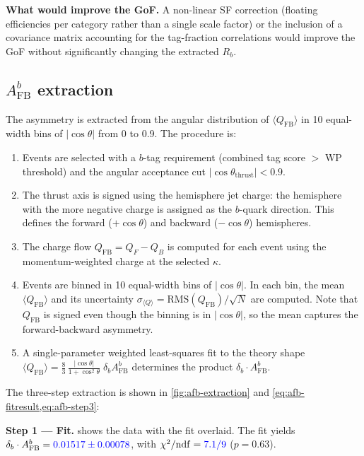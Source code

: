 \documentclass[11pt,a4paper]{article}
\newcommand{\measured}[1]{\textcolor{blue}{#1}}
\begin{document}
\textbf{What would improve the GoF.}
A non-linear SF correction (floating efficiencies per category rather
than a single scale factor) or the inclusion of a covariance matrix
accounting for the tag-fraction correlations would improve the GoF
without significantly changing the extracted $R_b$.

\subsection{$A_\mathrm{FB}^b$ extraction}

The asymmetry is extracted from the angular distribution of
$\langle Q_\mathrm{FB} \rangle$ in 10 equal-width bins of
$|\cos\theta|$ from 0 to 0.9.  The procedure is:

\begin{enumerate}
\item Events are selected with a $b$-tag requirement (combined tag
  score $>$ WP threshold) and the angular acceptance cut
  $|\cos\theta_\mathrm{thrust}| < 0.9$.
\item The thrust axis is signed using the hemisphere jet charge: the
  hemisphere with the more negative charge is assigned as the $b$-quark
  direction.  This defines the forward ($+\cos\theta$) and backward
  ($-\cos\theta$) hemispheres.
\item The charge flow $Q_\mathrm{FB} = Q_F - Q_B$ is computed for each
  event using the momentum-weighted charge at the selected $\kappa$.
\item Events are binned in 10 equal-width bins of $|\cos\theta|$.  In
  each bin, the mean $\langle Q_\mathrm{FB} \rangle$ and its uncertainty
  $\sigma_{\langle Q \rangle} = \mathrm{RMS}(Q_\mathrm{FB}) / \sqrt{N}$
  are computed.  Note that $Q_\mathrm{FB}$ is signed even though the
  binning is in $|\cos\theta|$, so the mean captures the forward-backward
  asymmetry.
\item A single-parameter weighted least-squares fit to the theory shape
  $\langle Q_\mathrm{FB} \rangle = \frac{8}{3}\,
  \frac{|\cos\theta|}{1 + \cos^2\!\theta}\;\delta_b A_\mathrm{FB}^b$
  determines the product $\delta_b \cdot A_\mathrm{FB}^b$.
\end{enumerate}

The three-step extraction is shown in \cref{fig:afb-extraction} and
\cref{eq:afb-fitresult,eq:afb-step3}:

\textbf{Step 1 --- Fit.}
 shows the data with the fit overlaid.  The
fit yields
$\delta_b \cdot A_\mathrm{FB}^b = \measured{0.01517 \pm 0.00078}$,
with $\chi^2/\mathrm{ndf} = \measured{7.1/9}$ ($p = 0.63$).
\end{document}
